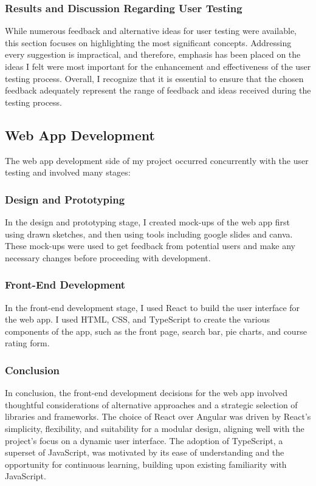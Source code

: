\documentclass[10pt,twocolumn]{article}
\begin{document}
\subsubsection{Results and Discussion Regarding User Testing}

While numerous feedback and alternative ideas for user testing were available, this section focuses on highlighting the most significant concepts. Addressing every suggestion is impractical, and therefore, emphasis has been placed on the ideas I felt were most important for the enhancement and effectiveness of the user testing process. Overall, I recognize that it is essential to ensure that the chosen feedback adequately represent the range of feedback and ideas received during the testing process.

\subsection{Web App Development}
The web app development side of my project occurred concurrently with the user testing and involved many stages: 

\subsubsection{Design and Prototyping}
In the design and prototyping stage, I created mock-ups of the web app first using drawn sketches, and then using tools including google slides and canva. These mock-ups were used to get feedback from potential users and make any necessary changes before proceeding with development.

\subsubsection{Front-End Development}
In the front-end development stage, I used React to build the user interface for the web app. I used HTML, CSS, and TypeScript to create the various components of the app, such as the front page, search bar, pie charts, and course rating form.

\subsubsection{Conclusion}
In conclusion, the front-end development decisions for the web app involved thoughtful considerations of alternative approaches and a strategic selection of libraries and frameworks. The choice of React over Angular was driven by React's simplicity, flexibility, and suitability for a modular design, aligning well with the project's focus on a dynamic user interface. The adoption of TypeScript, a superset of JavaScript, was motivated by its ease of understanding and the opportunity for continuous learning, building upon existing familiarity with JavaScript.
\end{document}

